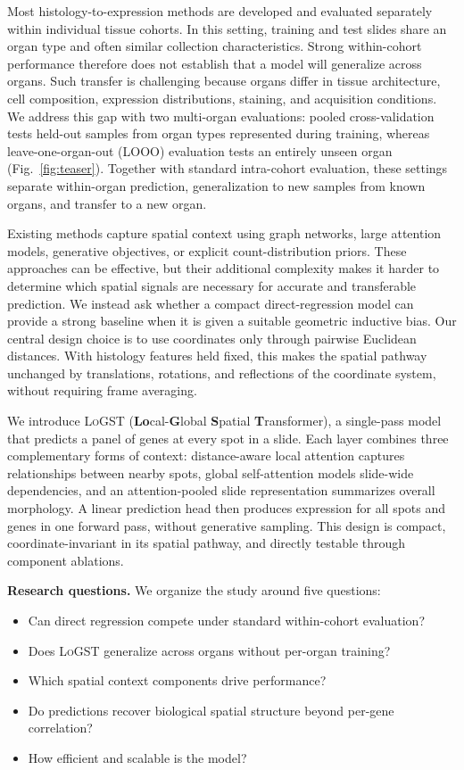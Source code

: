 \documentclass[10pt,twocolumn,letterpaper]{article}
\newcommand{\morph}{\textsc{LoGST}}
\begin{document}
Most histology-to-expression methods are developed and evaluated separately within individual
tissue cohorts. In this setting, training and test slides share an organ type and often similar
collection characteristics. Strong within-cohort performance therefore does not establish that a
model will generalize across organs. Such transfer is challenging because organs differ in tissue
architecture, cell composition, expression distributions, staining, and acquisition conditions. We
address this gap with two multi-organ evaluations: pooled cross-validation tests held-out samples
from organ types represented during training, whereas leave-one-organ-out (LOOO) evaluation tests an
entirely unseen organ (Fig.~\ref{fig:teaser}). Together with standard intra-cohort evaluation, these
settings separate within-organ prediction, generalization to new samples from known organs, and
transfer to a new organ.

Existing methods capture spatial context using graph networks, large attention models, generative
objectives, or explicit count-distribution priors. These approaches can be effective, but their
additional complexity makes it harder to determine which spatial signals are necessary for accurate
and transferable prediction. We instead ask whether a compact direct-regression model can provide a
strong baseline when it is given a suitable geometric inductive bias. Our central design choice is
to use coordinates only through pairwise Euclidean distances. With histology features held fixed,
this makes the spatial pathway unchanged by translations, rotations, and reflections of the
coordinate system, without requiring frame averaging.

We introduce \morph{} (\textbf{Lo}cal-\textbf{G}lobal \textbf{S}patial \textbf{T}ransformer), a
single-pass model that predicts a panel of genes at every spot in a slide. Each layer combines three
complementary forms of context: distance-aware local attention captures relationships between nearby
spots, global self-attention models slide-wide dependencies, and an attention-pooled slide
representation summarizes overall morphology. A linear prediction head then produces expression for
all spots and genes in one forward pass, without generative sampling. This design is compact,
coordinate-invariant in its spatial pathway, and directly testable through component ablations.

\smallskip\noindent\textbf{Research questions.} We organize the study around five questions:
\begin{itemize}[leftmargin=1.5em,itemsep=0pt,topsep=2pt]
  \item[\textbf{RQ1}] Can direct regression compete under standard within-cohort evaluation?
  \item[\textbf{RQ2}] Does \morph{} generalize across organs without per-organ training?
  \item[\textbf{RQ3}] Which spatial context components drive performance?
  \item[\textbf{RQ4}] Do predictions recover biological spatial structure beyond per-gene correlation?
  \item[\textbf{RQ5}] How efficient and scalable is the model?
\end{itemize}
\end{document}
